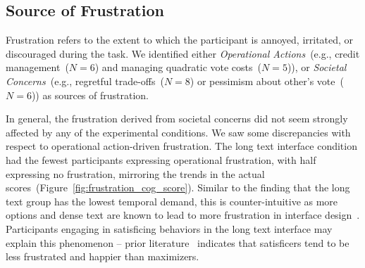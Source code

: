 
%

\subsection{Source of Frustration} 
\label{sec:frustration}

Frustration refers to the extent to which the participant is annoyed, irritated, or discouraged during the task. We identified either \textit{Operational Actions}~(e.g., credit management~($N=6$) and managing quadratic vote costs~($N=5$)), or \textit{Societal Concerns}~(e.g., regretful trade-offs~($N=8$) or pessimism about other's vote~($N=6$)) as sources of frustration.

In general, the frustration derived from societal concerns did not seem strongly affected by any of the experimental conditions. We saw some discrepancies with respect to operational action-driven frustration. The long text interface condition had the fewest participants expressing operational frustration, with half expressing no frustration, mirroring the trends in the actual scores~(Figure~\ref{fig:frustration_cog_score}). Similar to the finding that the long text group has the lowest temporal demand, this is counter-intuitive as more options and dense text are known to lead to more frustration in interface design~\cite{nielsen1997users}. Participants engaging in satisficing behaviors in the long text interface may explain this phenomenon -- prior literature~\cite{polmanWhyAreMaximizers2010, schwartzMaximizingSatisficingHappiness2002} indicates that satisficers tend to be less frustrated and happier than maximizers. 

